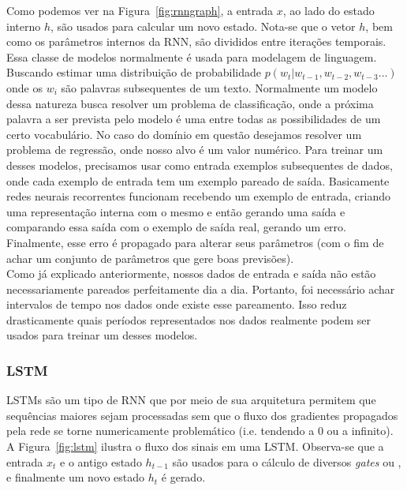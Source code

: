 Como podemos ver na Figura~\ref{fig:rnngraph}, a entrada $x$, ao lado do estado
interno $h$, são usados para calcular um novo estado. Nota-se que o vetor $h$,
bem como os parâmetros internos da RNN, são divididos entre iterações temporais.
\\

Essa classe de modelos normalmente é usada para modelagem de linguagem. Buscando
estimar uma distribuição de probabilidade $p(w_t | w_{t-1},w_{t-2},w_{t-3} \dots
) $ onde os $w_i$ são palavras subsequentes de um texto. Normalmente um modelo
dessa natureza busca resolver um problema de classificação, onde a próxima palavra
a ser prevista pelo modelo é uma entre todas as possibilidades de um certo
vocabulário. No caso do domínio em questão desejamos resolver um problema de
regressão, onde nosso alvo é um valor numérico. Para treinar um desses modelos,
precisamos usar como entrada exemplos subsequentes de dados, onde cada exemplo
de entrada tem um exemplo pareado de saída. Basicamente redes neurais
recorrentes funcionam recebendo um exemplo de entrada, criando uma representação
interna com o mesmo e então gerando uma saída e comparando essa saída com o
exemplo de saída real, gerando um erro. Finalmente, esse erro é propagado para
alterar seus parâmetros (com o fim de achar um conjunto de parâmetros que gere
boas previsões). \\ 


Como já explicado anteriormente, nossos dados de entrada e saída não estão necessariamente pareados perfeitamente dia a dia. Portanto, foi necessário achar intervalos de tempo nos dados onde existe esse pareamento. Isso reduz drasticamente quais períodos representados nos dados realmente podem ser usados para treinar um desses modelos.


\subsubsection{LSTM}
\label{sec:lstm}

LSTMs \citep{lstm} são um tipo de RNN que por meio de sua arquitetura permitem que sequências
maiores sejam processadas sem que o fluxo dos gradientes propagados pela rede se torne
numericamente problemático (i.e. tendendo a 0 ou a infinito). A
Figura~\ref{fig:lstm} ilustra o fluxo dos sinais em uma LSTM. Observa-se que a
entrada $x_t$ e o antigo estado $h_{t-1}$ são usados para o cálculo de diversos \textit{gates} ou , e
finalmente um novo estado $h_t$ é gerado.\\

